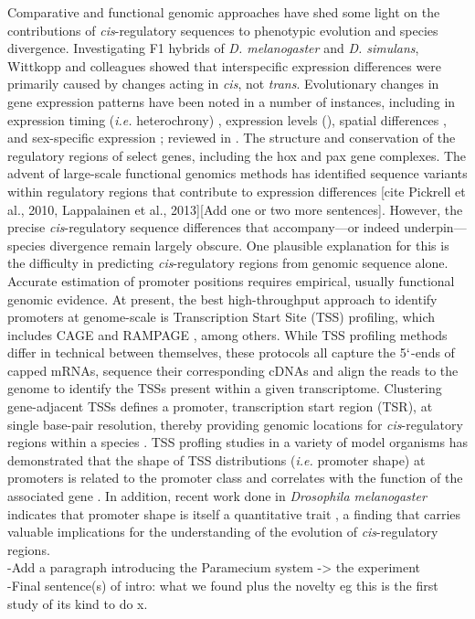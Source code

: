 \documentclass[nogrid]{MBE}%
\begin{document}
Comparative and functional genomic approaches have shed some light on the contributions of \textit{cis}-regulatory sequences to phenotypic evolution and species divergence. Investigating F1 hybrids of \textit{D. melanogaster} and \textit{D. simulans}, Wittkopp and colleagues \citep{Wittkopp:2004cy} showed that interspecific expression differences were primarily caused by changes acting in \textit{cis}, not \textit{trans}. Evolutionary changes in gene expression patterns have been noted in a number of instances, including in expression timing (\textit{i.e.} heterochrony) \citep{Wray:1989ku}, expression levels (\citep{Crawford:1999ic}), spatial differences \citep{Abzhanov:2000vb}, and sex-specific expression \citep{Kopp:2000bl}; reviewed in \citep{Wray:2003kn}. The structure and conservation of the regulatory regions of select genes, including the hox \citep{Kmita:2002hg} and pax \citep{Plaza:1999kc} gene complexes. The advent of large-scale functional genomics methods has identified sequence variants within regulatory regions that contribute to expression differences [cite Pickrell et al., 2010, Lappalainen et al., 2013][Add one or two more sentences]. However, the precise \textit{cis}-regulatory sequence differences that accompany---or indeed underpin---species divergence remain largely obscure. One plausible explanation for this is the difficulty in predicting \textit{cis}-regulatory regions from genomic sequence alone. Accurate estimation of promoter positions requires empirical, usually functional genomic evidence. At present, the best high-throughput approach to identify promoters at genome-scale is Transcription Start Site (TSS) profiling, which includes CAGE \citep{Murata:2014gpb} and RAMPAGE \citep{Batut:2013fu}, among others. While TSS profiling methods differ in technical between themselves, these protocols all capture the 5$`$-ends of capped mRNAs, sequence their corresponding cDNAs and align the reads to the genome to identify the TSSs present within a given transcriptome. Clustering gene-adjacent TSSs defines a promoter, transcription start region (TSR), at single base-pair resolution, thereby providing genomic locations for \textit{cis}-regulatory regions within a species \citep{Lenhard:2012ena,Rach:2009ct}. TSS profling studies in a variety of model organisms has demonstrated that the shape of TSS distributions (\textit{i.e.} promoter shape) at promoters is related to the promoter class and correlates with the function of the associated gene \citep{Carninci:2006in, Rach:2009ct,Hoskins:2011io,Raborn:2016cr}. In addition, recent work done in \textit{Drosophila melanogaster} indicates that promoter shape is itself a quantitative trait \citep{Schor:2017fw}, a finding that carries valuable implications for the understanding of the evolution of \textit{cis}-regulatory regions. \\ 
-Add a paragraph introducing the Paramecium system -> the experiment\\
-Final sentence(s) of intro: what we found plus the novelty eg this is the first study of its kind to do x.
\end{document}
